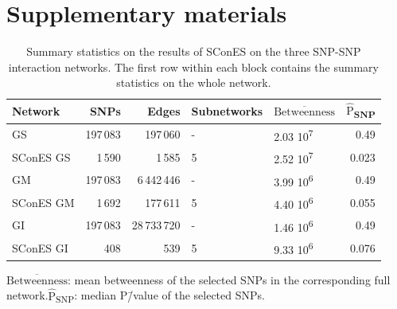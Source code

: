 \documentclass[twocolumn, 11pt]{article}
\newcommand{\mean}[1]{$\overline{\mbox{#1}}$}
\newcommand{\median}[1]{$\hat{\mbox{#1}}$}
\begin{document}



\clearpage
\setcounter{figure}{0}
\setcounter{section}{0}
\setcounter{table}{0}

\section{Supplementary materials}

\begin{table}[htbp]
\begin{threeparttable}
\caption{Summary statistics on the results of SConES on the three SNP-SNP interaction networks. The first row within each block contains the summary statistics on the whole network.}
\label{tab:snp_solutions}
\centering
\begin{tabular}{lrrllr}
Network & SNPs & Edges & Subnetworks & \mean{Betweenness} & \median{P}\textsubscript{SNP}\\
\hline
GS & 197\,083 & 197\,060 & - & 2.03 \texttimes{} 10\textsuperscript{7} & 0.49\\
SConES GS & 1\,590 & 1\,585 & 5 & 2.52 \texttimes{} 10\textsuperscript{7} & 0.023\\
\hline
GM & 197\,083 & 6\,442\,446 & - & 3.99 \texttimes{} 10\textsuperscript{6} & 0.49\\
SConES GM & 1\,692 & 177\,611 & 5 & 4.40 \texttimes{} 10\textsuperscript{6} & 0.055\\
\hline
GI & 197\,083 & 28\,733\,720 & - & 1.46 \texttimes{} 10\textsuperscript{6} & 0.49\\
SConES GI & 408 & 539 & 5 & 9.33 \texttimes{} 10\textsuperscript{6} & 0.076\\
\end{tabular}
\begin{tablenotes}
  \footnotesize{
    \item \mean{Betweenness}: mean betweenness of the selected SNPs in the corresponding full network.\median{P}\textsubscript{SNP}: median P\=/value of the selected SNPs.
  }
\end{tablenotes}
\end{threeparttable}
\end{table}
\end{document}
